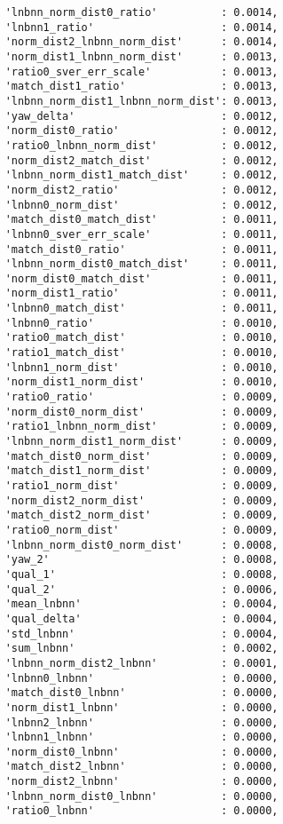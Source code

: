 \begin{verbatim}
    'lnbnn_norm_dist0_ratio'          : 0.0014,
    'lnbnn1_ratio'                    : 0.0014,
    'norm_dist2_lnbnn_norm_dist'      : 0.0014,
    'norm_dist1_lnbnn_norm_dist'      : 0.0013,
    'ratio0_sver_err_scale'           : 0.0013,
    'match_dist1_ratio'               : 0.0013,
    'lnbnn_norm_dist1_lnbnn_norm_dist': 0.0013,
    'yaw_delta'                       : 0.0012,
    'norm_dist0_ratio'                : 0.0012,
    'ratio0_lnbnn_norm_dist'          : 0.0012,
    'norm_dist2_match_dist'           : 0.0012,
    'lnbnn_norm_dist1_match_dist'     : 0.0012,
    'norm_dist2_ratio'                : 0.0012,
    'lnbnn0_norm_dist'                : 0.0012,
    'match_dist0_match_dist'          : 0.0011,
    'lnbnn0_sver_err_scale'           : 0.0011,
    'match_dist0_ratio'               : 0.0011,
    'lnbnn_norm_dist0_match_dist'     : 0.0011,
    'norm_dist0_match_dist'           : 0.0011,
    'norm_dist1_ratio'                : 0.0011,
    'lnbnn0_match_dist'               : 0.0011,
    'lnbnn0_ratio'                    : 0.0010,
    'ratio0_match_dist'               : 0.0010,
    'ratio1_match_dist'               : 0.0010,
    'lnbnn1_norm_dist'                : 0.0010,
    'norm_dist1_norm_dist'            : 0.0010,
    'ratio0_ratio'                    : 0.0009,
    'norm_dist0_norm_dist'            : 0.0009,
    'ratio1_lnbnn_norm_dist'          : 0.0009,
    'lnbnn_norm_dist1_norm_dist'      : 0.0009,
    'match_dist0_norm_dist'           : 0.0009,
    'match_dist1_norm_dist'           : 0.0009,
    'ratio1_norm_dist'                : 0.0009,
    'norm_dist2_norm_dist'            : 0.0009,
    'match_dist2_norm_dist'           : 0.0009,
    'ratio0_norm_dist'                : 0.0009,
    'lnbnn_norm_dist0_norm_dist'      : 0.0008,
    'yaw_2'                           : 0.0008,
    'qual_1'                          : 0.0008,
    'qual_2'                          : 0.0006,
    'mean_lnbnn'                      : 0.0004,
    'qual_delta'                      : 0.0004,
    'std_lnbnn'                       : 0.0004,
    'sum_lnbnn'                       : 0.0002,
    'lnbnn_norm_dist2_lnbnn'          : 0.0001,
    'lnbnn0_lnbnn'                    : 0.0000,
    'match_dist0_lnbnn'               : 0.0000,
    'norm_dist1_lnbnn'                : 0.0000,
    'lnbnn2_lnbnn'                    : 0.0000,
    'lnbnn1_lnbnn'                    : 0.0000,
    'norm_dist0_lnbnn'                : 0.0000,
    'match_dist2_lnbnn'               : 0.0000,
    'norm_dist2_lnbnn'                : 0.0000,
    'lnbnn_norm_dist0_lnbnn'          : 0.0000,
    'ratio0_lnbnn'                    : 0.0000,

\end{verbatim}
